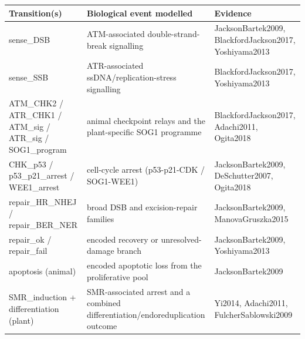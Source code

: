 \begin{tabular}{p{4.4cm}p{7.2cm}l}
\toprule
Transition(s) & Biological event modelled & Evidence \\
\midrule
sense\_DSB & ATM-associated double-strand-break signalling & JacksonBartek2009, BlackfordJackson2017, Yoshiyama2013 \\
sense\_SSB & ATR-associated ssDNA/replication-stress signalling & BlackfordJackson2017, Yoshiyama2013 \\
ATM\_CHK2 / ATR\_CHK1 / ATM\_sig / ATR\_sig / SOG1\_program & animal checkpoint relays and the plant-specific SOG1 programme & BlackfordJackson2017, Adachi2011, Ogita2018 \\
CHK\_p53 / p53\_p21\_arrest / WEE1\_arrest & cell-cycle arrest (p53-p21-CDK / SOG1-WEE1) & JacksonBartek2009, DeSchutter2007, Ogita2018 \\
repair\_HR\_NHEJ / repair\_BER\_NER & broad DSB and excision-repair families & JacksonBartek2009, ManovaGruszka2015 \\
repair\_ok / repair\_fail & encoded recovery or unresolved-damage branch & JacksonBartek2009, Yoshiyama2013 \\
apoptosis (animal) & encoded apoptotic loss from the proliferative pool & JacksonBartek2009 \\
SMR\_induction + differentiation (plant) & SMR-associated arrest and a combined differentiation/endoreduplication outcome & Yi2014, Adachi2011, FulcherSablowski2009 \\
\bottomrule
\end{tabular}

